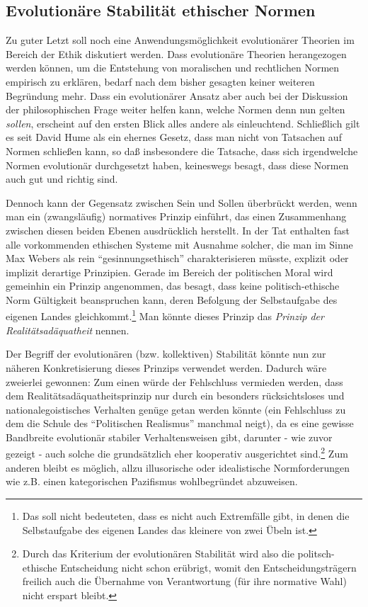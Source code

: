 \documentclass[12pt,a4paper,ngerman]{article}
\begin{document}
\subsection{Evolutionäre Stabilität ethischer Normen}

Zu guter Letzt soll noch eine Anwendungsmöglichkeit evolutionärer
Theorien im Bereich der Ethik diskutiert werden. Dass evolutionäre
Theorien herangezogen werden können, um die Entstehung von moralischen
und rechtlichen Normen empirisch zu erklären, bedarf nach dem bisher
gesagten keiner weiteren Begründung mehr. Dass ein evolutionärer
Ansatz aber auch bei der Diskussion der philosophischen Frage weiter
helfen kann, welche Normen denn nun gelten {\em sollen}, erscheint auf
den ersten Blick alles andere als einleuchtend. Schließlich gilt es
seit David Hume als ein ehernes Gesetz, dass man nicht von Tatsachen
auf Normen schließen kann, so daß insbesondere die Tatsache, dass sich
irgendwelche Normen evolutionär durchgesetzt haben, keineswegs besagt,
dass diese Normen auch gut und richtig sind.

Dennoch kann der Gegensatz zwischen Sein und Sollen überbrückt werden,
wenn man ein (zwangsläufig) normatives Prinzip einführt, das einen
Zusammenhang zwischen diesen beiden Ebenen ausdrücklich herstellt. In
der Tat enthalten fast alle vorkommenden ethischen Systeme mit
Ausnahme solcher, die man im Sinne Max Webers als rein
"`gesinnungsethisch"' charakterisieren müsste, explizit oder implizit
derartige Prinzipien. Gerade im Bereich der politischen Moral wird
gemeinhin ein Prinzip angenommen, das besagt, dass keine
politisch-ethische Norm Gültigkeit beanspruchen kann, deren Befolgung
der Selbstaufgabe des eigenen Landes gleichkommt.\footnote{Das soll
  nicht bedeuteten, dass es nicht auch Extremfälle gibt, in denen die
  Selbstaufgabe des eigenen Landes das kleinere von zwei Übeln ist.}
Man könnte dieses Prinzip das {\em Prinzip der Realitätsadäquatheit}
nennen.

Der Begriff der evolutionären (bzw. kollektiven) Stabilität könnte nun zur
näheren Konkretisierung dieses Prinzips verwendet werden. Dadurch wäre
zweierlei gewonnen: Zum einen würde der Fehlschluss vermieden werden, dass dem
Realitätsadäquatheitsprinzip nur durch ein besonders rücksichtsloses und
nationalegoistisches Verhalten genüge getan werden könnte (ein Fehlschluss zu
dem die Schule des "`Politischen Realismus"' manchmal neigt), da es eine
gewisse Bandbreite evolutionär stabiler Verhaltensweisen gibt, darunter - wie
zuvor gezeigt - auch solche die grundsätzlich eher kooperativ ausgerichtet
sind.\footnote{Durch das Kriterium der evolutionären Stabilität wird also die
politsch-ethische Entscheidung nicht schon erübrigt, womit den
Entscheidungsträgern freilich auch die Übernahme von Verantwortung (für ihre
normative Wahl) nicht erspart bleibt.} Zum anderen bleibt es möglich, allzu
illusorische oder idealistische Normforderungen wie z.B. einen kategorischen
Pazifismus wohlbegründet abzuweisen.
\end{document}
